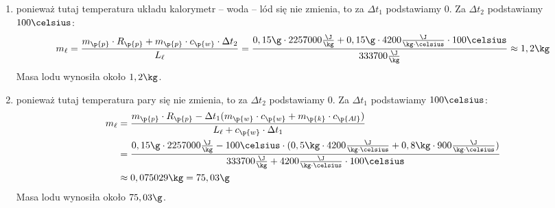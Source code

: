\begin{enumerate}[label={\alph*)}]
    \item ponieważ tutaj temperatura układu kalorymetr -- woda -- lód się nie zmienia, to za \(\Delta t_1\) podstawiamy \(0\). Za \(\Delta t_2\) podstawiamy \(100\celsius\):
        \begin{equation*}
            m_\ell = \frac{m_\p{p} \cdot R_\p{p} + m_\p{p} \cdot c_\p{w} \cdot \Delta t_2}{L_\ell}
                = \frac{0,15\g \cdot 2257000\frac{\J}{\kg} + 0,15\g \cdot 4200\frac{\J}{\kg \cdot \celsius} \cdot 100\celsius}{333700\frac{\J}{\kg}}
                \approx 1,2\kg
        \end{equation*}
        \answer{} Masa lodu wynosiła około \(1,2\kg\).
    \item ponieważ tutaj temperatura pary się nie zmienia, to za \(\Delta t_2\) podstawiamy \(0\). Za \(\Delta t_1\) podstawiamy \(100\celsius\):
        \begin{equation*}
            \begin{split}
                m_\ell &= \frac{m_\p{p} \cdot R_\p{p} - \Delta t_1 (m_\p{w} \cdot c_\p{w} + m_\p{k} \cdot c_\p{Al})}{L_\ell + c_\p{w} \cdot \Delta t_1}\\
                    &= \frac{0,15\g \cdot 2257000\frac{\J}{\kg} - 100\celsius \cdot (0,5\kg \cdot 4200\frac{\J}{\kg \cdot \celsius} + 0,8\kg \cdot 900\frac{\J}{\kg \cdot \celsius})}{333700\frac{\J}{\kg} + 4200\frac{\J}{\kg \cdot \celsius} \cdot 100\celsius}\\
                    &\approx 0,075029\kg
                    = 75,03\g
            \end{split}
        \end{equation*}
        \answer{} Masa lodu wynosiła około \(75,03\g\).
\end{enumerate}
